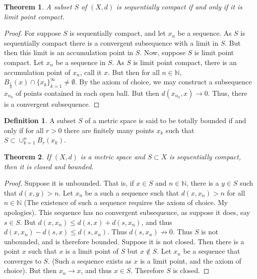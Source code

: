 \documentclass[oneside]{book}
\newtheorem{theorem}{Theorem}[section]
\theoremstyle{definition}
\newtheorem{definition}{Definition}[section]
\begin{document}
\begin{theorem}
A subset $S$ of $(X,d)$ is sequentially compact if and only if it is limit point compact.
\end{theorem}
\begin{proof}
For suppose $S$ is sequentially compact, and let $x_n$ be a sequence. As $S$ is sequentially compact there is a convergent subsequence with a limit in $S$. But then this limit is an accumulation point in $S$. Now, suppose $S$ is limit point compact. Let $x_n$ be a sequence in $S$. As $S$ is limit point compact, there is an accumulation point of $x_n$, call it $x$. But then for all $n\in \mathbb{N}$, $B_{\frac{1}{n}}(x)\cap \{x_k\}_{k=1}^{\infty}\ne \emptyset$. By the axiom of choice, we may construct a subsequence $x_{n_k}$ of points contained in each open ball. But then $d(x_{n_k},x)\rightarrow 0$. Thus, there is a convergent subsequence.
\end{proof}

\begin{definition}
A subset $S$ of a metric space is said to be totally bounded if and only if for all $r>0$ there are finitely many points $x_k$ such that $S\subset \cup_{k=1}^{n} B_{r}(x_k)$.
\end{definition}

\begin{theorem}
If $(X,d)$ is a metric space and $S\subset X$ is sequentially compact, then it is closed and bounded.
\end{theorem}
\begin{proof}
\item Suppose it is unbounded. That is, if $x\in S$ and $n\in \mathbb{N}$, there is a $y\in S$ such that $d(x,y)>n$. Let $x_n$ be a such a sequence such that $d(x,x_n)>n$ for all $n\in \mathbb{N}$ (The existence of such a sequence requires the axiom of choice. My apologies). This sequence has no convergent subsequence, as suppose it does, say $s\in S$. But $d(x,x_n) \leq d(s,x)+d(s,x_n)$, and thus $d(x,x_n)-d(s,x)\leq d(s,x_n)$. Thus $d(s,x_n) \not\rightarrow 0$. Thus $S$ is not unbounded, and is therefore bounded. Suppose it is not closed. Then there is a point $x$ such that $x$ is a limit point of $S$ but $x\notin S$. Let $x_n$ be a sequence that converges to $S$. (Such a sequence exists as $x$ is a limit point, and the axiom of choice). But then $x_n \rightarrow x$, and thus $x\in S$. Therefore $S$ is closed.
\end{proof}
\end{document}
